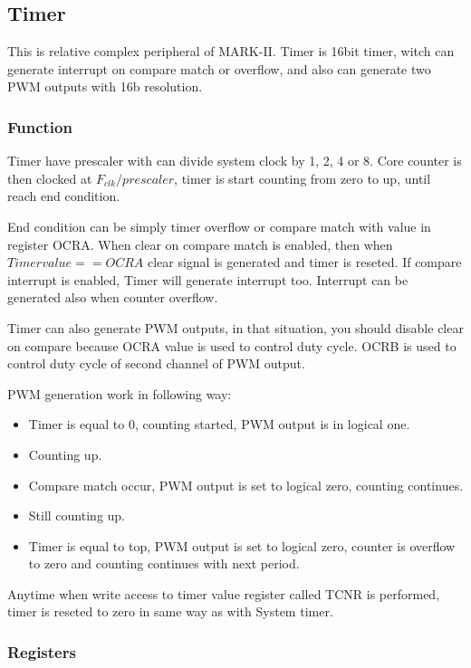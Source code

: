 \subsection{Timer}

This is relative complex peripheral of MARK-II. Timer is 16bit timer, witch can
generate interrupt on compare match or overflow, and also can generate two PWM
outputs with 16b resolution.

\subsubsection{Function}

Timer have prescaler with can divide system clock by 1, 2, 4 or 8. Core counter
is then clocked at $F_{clk}/prescaler$, timer is start counting from zero to
up, until reach end condition.

End condition can be simply timer overflow or compare match with value in
register OCRA. When clear on compare match is enabled, then when $Timer value
== OCRA$ clear signal is generated and timer is reseted. If compare interrupt
is enabled, Timer will generate interrupt too. Interrupt can be generated also
when counter overflow.

Timer can also generate PWM outputs, in that situation, you should disable
clear on compare because OCRA value is used to control duty cycle. OCRB is
used to control duty cycle of second channel of PWM output.

PWM generation work in following way:

\begin{itemize}
    \item Timer is equal to 0, counting started, PWM output is in logical one.
    \item Counting up.
    \item Compare match occur, PWM output is set to logical zero, counting continues.
    \item Still counting up.
    \item Timer is equal to top, PWM output is set to logical zero, counter is overflow to zero and counting continues with next period.
\end{itemize}

Anytime when write access to timer value register called TCNR is performed,
timer is reseted to zero in same way as with System timer.

\subsubsection{Registers}


